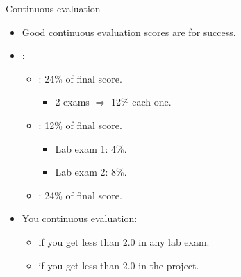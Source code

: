 \begin{frame}[t]{Continuous evaluation}
\begin{itemize}
  \item Good continuous evaluation scores are  for success.

  \item {}:
    \begin{itemize}
      \item {}: 24\% of final score.
        \begin{itemize}
          \item 2 exams $\Rightarrow$ 12\% each one.
        \end{itemize}
      \item {}: 12\% of final score.
        \begin{itemize}
          \item Lab exam 1: 4\%.
          \item Lab exam 2: 8\%.
        \end{itemize}
      \item {}: 24\% of final score.
    \end{itemize}
  \vspace{1em}

  \item You  continuous evaluation:
    \begin{itemize}
      \item if you get less than 2.0 in any lab exam.
      \item if you get less than 2.0 in the project.
    \end{itemize}
\end{itemize}
\end{frame}


